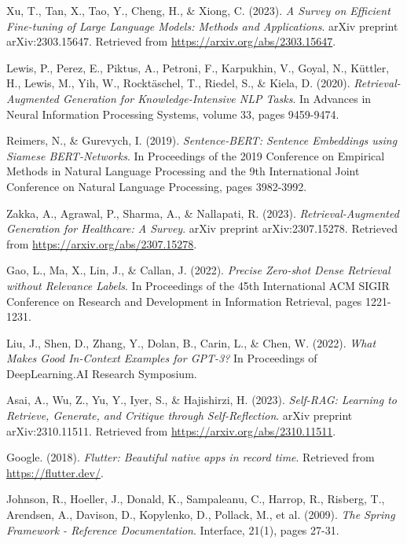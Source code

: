 \begin{thebibliography}{99}
 Xu, T., Tan, X., Tao, Y., Cheng, H., \& Xiong, C. (2023). \textit{A Survey on Efficient Fine-tuning of Large Language Models: Methods and Applications}. arXiv preprint arXiv:2303.15647. Retrieved from \url{https://arxiv.org/abs/2303.15647}.

 Lewis, P., Perez, E., Piktus, A., Petroni, F., Karpukhin, V., Goyal, N., Küttler, H., Lewis, M., Yih, W., Rocktäschel, T., Riedel, S., \& Kiela, D. (2020). \textit{Retrieval-Augmented Generation for Knowledge-Intensive NLP Tasks}. In Advances in Neural Information Processing Systems, volume 33, pages 9459-9474.

 Reimers, N., \& Gurevych, I. (2019). \textit{Sentence-BERT: Sentence Embeddings using Siamese BERT-Networks}. In Proceedings of the 2019 Conference on Empirical Methods in Natural Language Processing and the 9th International Joint Conference on Natural Language Processing, pages 3982-3992.

 Zakka, A., Agrawal, P., Sharma, A., \& Nallapati, R. (2023). \textit{Retrieval-Augmented Generation for Healthcare: A Survey}. arXiv preprint arXiv:2307.15278. Retrieved from \url{https://arxiv.org/abs/2307.15278}.

 Gao, L., Ma, X., Lin, J., \& Callan, J. (2022). \textit{Precise Zero-shot Dense Retrieval without Relevance Labels}. In Proceedings of the 45th International ACM SIGIR Conference on Research and Development in Information Retrieval, pages 1221-1231.

 Liu, J., Shen, D., Zhang, Y., Dolan, B., Carin, L., \& Chen, W. (2022). \textit{What Makes Good In-Context Examples for GPT-3?} In Proceedings of DeepLearning.AI Research Symposium.

 Asai, A., Wu, Z., Yu, Y., Iyer, S., \& Hajishirzi, H. (2023). \textit{Self-RAG: Learning to Retrieve, Generate, and Critique through Self-Reflection}. arXiv preprint arXiv:2310.11511. Retrieved from \url{https://arxiv.org/abs/2310.11511}.

 Google. (2018). \textit{Flutter: Beautiful native apps in record time}. Retrieved from \url{https://flutter.dev/}.

 Johnson, R., Hoeller, J., Donald, K., Sampaleanu, C., Harrop, R., Risberg, T., Arendsen, A., Davison, D., Kopylenko, D., Pollack, M., et al. (2009). \textit{The Spring Framework - Reference Documentation}. Interface, 21(1), pages 27-31.


\end{thebibliography}
